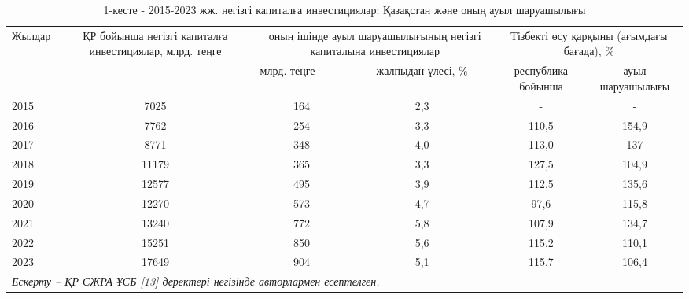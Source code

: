 \begin{table}[H]
\caption*{1-кесте - 2015-2023 жж. негізгі капиталға инвестициялар: Қазақстан және оның ауыл шаруашылығы}
\centering
\begin{tabular}{|lccccc|}
\hline
\multicolumn{1}{|l|}{\multirow{2}{*}{Жылдар}} &
  \multicolumn{1}{p{0.2\textwidth}|}{\multirow{2}{=}{ҚР бойынша негізгі капиталға инвестициялар, млрд. теңге}} &
  \multicolumn{2}{p{0.25\textwidth}|}{оның ішінде ауыл шаруашылығының негізгі капиталына инвестициялар} &
  \multicolumn{2}{p{0.25\textwidth}|}{Тізбекті өсу қарқыны (ағымдағы бағада), \%} \\ \cline{3-6} 
\multicolumn{1}{|l|}{} &
  \multicolumn{1}{l|}{} &
  \multicolumn{1}{l|}{млрд. теңге} &
  \multicolumn{1}{p{0.1\textwidth}|}{жалпыдан үлесі, \%} &
  \multicolumn{1}{p{0.12\textwidth}|}{республика бойынша} &
  \multicolumn{1}{p{0.15\textwidth}|}{ауыл шаруашылығы} \\ \hline
\multicolumn{1}{|l|}{2015} & \multicolumn{1}{c|}{7025}  & \multicolumn{1}{c|}{164} & \multicolumn{1}{c|}{2,3} & \multicolumn{1}{c|}{-}     & -     \\ \hline
\multicolumn{1}{|l|}{2016} & \multicolumn{1}{c|}{7762}  & \multicolumn{1}{c|}{254} & \multicolumn{1}{c|}{3,3} & \multicolumn{1}{c|}{110,5} & 154,9 \\ \hline
\multicolumn{1}{|l|}{2017} & \multicolumn{1}{c|}{8771}  & \multicolumn{1}{c|}{348} & \multicolumn{1}{c|}{4,0} & \multicolumn{1}{c|}{113,0} & 137   \\ \hline
\multicolumn{1}{|l|}{2018} & \multicolumn{1}{c|}{11179} & \multicolumn{1}{c|}{365} & \multicolumn{1}{c|}{3,3} & \multicolumn{1}{c|}{127,5} & 104,9 \\ \hline
\multicolumn{1}{|l|}{2019} & \multicolumn{1}{c|}{12577} & \multicolumn{1}{c|}{495} & \multicolumn{1}{c|}{3,9} & \multicolumn{1}{c|}{112,5} & 135,6 \\ \hline
\multicolumn{1}{|l|}{2020} & \multicolumn{1}{c|}{12270} & \multicolumn{1}{c|}{573} & \multicolumn{1}{c|}{4,7} & \multicolumn{1}{c|}{97,6}  & 115,8 \\ \hline
\multicolumn{1}{|l|}{2021} & \multicolumn{1}{c|}{13240} & \multicolumn{1}{c|}{772} & \multicolumn{1}{c|}{5,8} & \multicolumn{1}{c|}{107,9} & 134,7 \\ \hline
\multicolumn{1}{|l|}{2022} & \multicolumn{1}{c|}{15251} & \multicolumn{1}{c|}{850} & \multicolumn{1}{c|}{5,6} & \multicolumn{1}{c|}{115,2} & 110,1 \\ \hline
\multicolumn{1}{|l|}{2023} & \multicolumn{1}{c|}{17649} & \multicolumn{1}{c|}{904} & \multicolumn{1}{c|}{5,1} & \multicolumn{1}{c|}{115,7} & 106,4 \\ \hline
\multicolumn{6}{|l|}{\textit{Ескерту – ҚР СЖРА ҰСБ {[}13{]} деректері негізінде авторлармен есептелген.}}                                          \\ \hline
\end{tabular}
\end{table}

